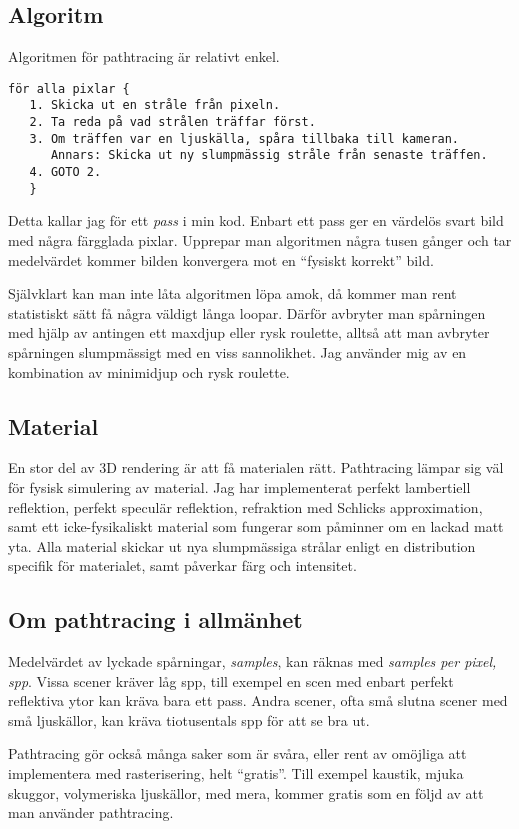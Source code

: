 \documentclass{article}
\begin{document}
\subsection{Algoritm}
Algoritmen för pathtracing är relativt enkel.
\begin{verbatim}
för alla pixlar {
   1. Skicka ut en stråle från pixeln.
   2. Ta reda på vad strålen träffar först.
   3. Om träffen var en ljuskälla, spåra tillbaka till kameran.
      Annars: Skicka ut ny slumpmässig stråle från senaste träffen.
   4. GOTO 2.
   }
\end{verbatim}
Detta kallar jag för ett \emph{pass} i min kod. Enbart ett pass ger en
värdelös svart bild med några färgglada pixlar. Upprepar man
algoritmen några tusen gånger och tar medelvärdet kommer bilden
konvergera mot en ``fysiskt korrekt'' bild.

Självklart kan man inte låta algoritmen löpa amok, då kommer man rent
statistiskt sätt få några väldigt långa loopar. Därför avbryter man
spårningen med hjälp av antingen ett maxdjup eller rysk roulette,
alltså att man avbryter spårningen slumpmässigt med en viss
sannolikhet. Jag använder mig av en kombination av minimidjup och rysk
roulette.

\subsection{Material}
En stor del av 3D rendering är att få materialen rätt. Pathtracing
lämpar sig väl för fysisk simulering av material. Jag har
implementerat perfekt lambertiell reflektion, perfekt speculär
reflektion, refraktion med Schlicks approximation, samt ett
icke-fysikaliskt material som fungerar som påminner om en lackad matt
yta. Alla material skickar ut nya slumpmässiga strålar enligt en
distribution specifik för materialet, samt påverkar färg och
intensitet.

\subsection{Om pathtracing i allmänhet}
Medelvärdet av lyckade spårningar, \emph{samples}, kan räknas med
\emph{samples per pixel, spp}. Vissa scener kräver låg spp, till
exempel en scen med enbart perfekt reflektiva ytor kan kräva bara ett
pass. Andra scener, ofta små slutna scener med små ljuskällor, kan
kräva tiotusentals spp för att se bra ut.

Pathtracing gör också många saker som är svåra, eller rent av omöjliga
att implementera med rasterisering, helt ``gratis''. Till exempel
kaustik, mjuka skuggor, volymeriska ljuskällor, med mera, kommer
gratis som en följd av att man använder pathtracing.
\end{document}
